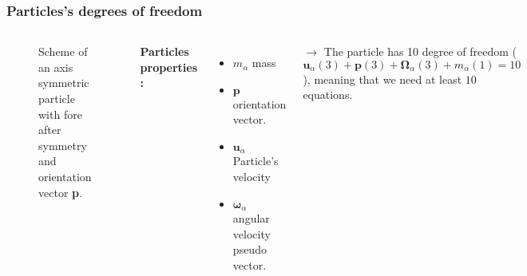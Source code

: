 \documentclass{sintefbeamer}
\begin{document}
\begin{frame}
  \frametitle{Particles's degrees of freedom}
  \begin{columns}
    \begin{figure}[h!]
      \centering
      \caption{Scheme of an axis symmetric particle with fore after symmetry and orientation vector \textbf{p}.}
    \end{figure}
\textbf{Particles properties :}
\begin{itemize}
  \item $m_\alpha$ mass 
  \item $\textbf{p}$ orientation vector.  
  \item $\textbf{u}_\alpha$ Particle's velocity 
  \item $\bm\omega_\alpha$ angular velocity pseudo vector. 
\end{itemize}

$\to$ The particle has 10 degree of freedom  ($\textbf{u}_\alpha(3) + \textbf{p}(3) + \bm\Omega_\alpha (3) + m_\alpha (1) = 10$), meaning that we need at least $10$ equations. 
\end{columns}

\end{frame}
\end{document}
